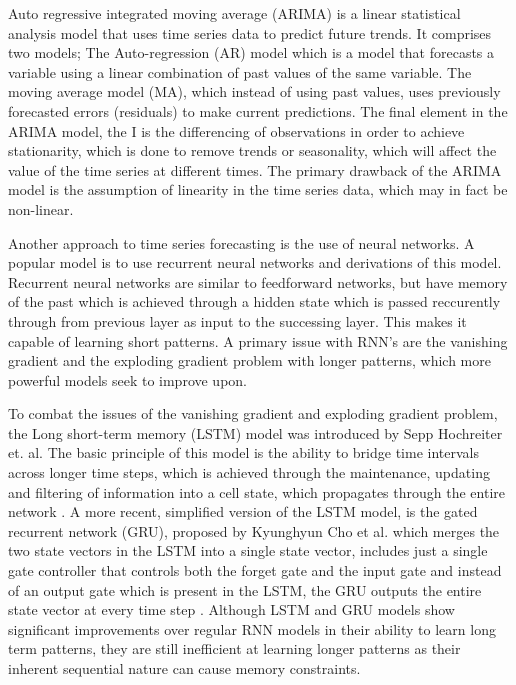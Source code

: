 Auto regressive integrated moving average (ARIMA) is a linear statistical analysis model that uses time series data to predict future trends. It comprises two models; The Auto-regression (AR) model which is a model that forecasts a variable using a linear combination of past values of the same variable. The moving average model (MA), which instead of using past values, uses previously forecasted errors (residuals) to make current predictions. 
The final element in the ARIMA model, the I is the differencing of observations in order to achieve stationarity, which is done to remove trends or seasonality, which will affect the value of the time series at different times. The primary drawback of the ARIMA model is the assumption of linearity in the time series data, which may in fact be non-linear.\cite{HybridArimaAndNN}\cite{ForecastinPrinciplesAndPractice}

Another approach to time series forecasting is the use of neural networks. A popular model is to use recurrent neural networks and derivations of this model. Recurrent neural networks are similar to feedforward networks, but have memory of the past which is achieved through a hidden state which is passed reccurently through from previous layer as input to the successing layer. This makes it capable of learning short patterns. 
A primary issue with RNN’s are the vanishing gradient and the exploding gradient problem with longer patterns, which more powerful models seek to improve upon.\cite{AIModernApproach}\cite{hands-onML}

To combat the issues of the vanishing gradient and exploding gradient problem, the Long short-term memory (LSTM) model was introduced by Sepp Hochreiter et. al. The basic principle of this model is the ability to bridge time intervals across longer time steps, which is achieved through the maintenance, updating and filtering of information into a cell state, which propagates through the entire network \cite{LSTMPaper}. 
A more recent, simplified version of the LSTM model, is the gated recurrent network (GRU), proposed by Kyunghyun Cho et al. which merges the two state vectors in the LSTM into a single state vector, includes just a single gate controller that controls both the forget gate and the input gate and instead of an output gate which is present in the LSTM, the GRU outputs the entire state vector at every time step\cite{RNNPaper} \cite{hands-onML}.
Although LSTM and GRU models show significant improvements over regular RNN models in their ability to learn long term patterns, they are still inefficient at learning longer patterns as their inherent sequential nature can cause memory constraints\cite{AttentionIsAllYouNeed}. 
